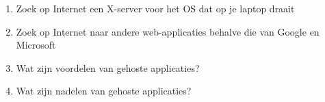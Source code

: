 \begin{enumerate}
	\item Zoek op Internet een X-server voor het OS dat op je laptop draait
	\item Zoek op Internet naar andere web-applicaties behalve die van Google en Microsoft
	\item Wat zijn voordelen van gehoste applicaties?
	\item Wat zijn nadelen van gehoste applicaties?
\end{enumerate}
